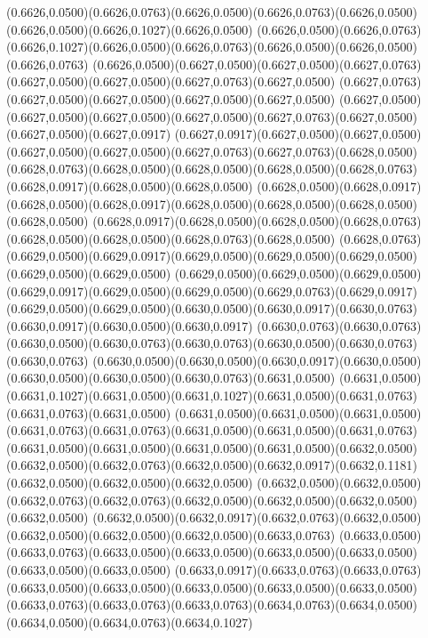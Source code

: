 (0.6626,0.0500)(0.6626,0.0763)(0.6626,0.0500)(0.6626,0.0763)(0.6626,0.0500)(0.6626,0.0500)(0.6626,0.1027)(0.6626,0.0500)
(0.6626,0.0500)(0.6626,0.0763)(0.6626,0.1027)(0.6626,0.0500)(0.6626,0.0763)(0.6626,0.0500)(0.6626,0.0500)(0.6626,0.0763)
(0.6626,0.0500)(0.6627,0.0500)(0.6627,0.0500)(0.6627,0.0763)(0.6627,0.0500)(0.6627,0.0500)(0.6627,0.0763)(0.6627,0.0500)
(0.6627,0.0763)(0.6627,0.0500)(0.6627,0.0500)(0.6627,0.0500)(0.6627,0.0500)
\PST@Solid(0.6627,0.0500)(0.6627,0.0500)(0.6627,0.0500)(0.6627,0.0500)(0.6627,0.0763)(0.6627,0.0500)(0.6627,0.0500)(0.6627,0.0917)
(0.6627,0.0917)(0.6627,0.0500)(0.6627,0.0500)(0.6627,0.0500)(0.6627,0.0500)(0.6627,0.0763)(0.6627,0.0763)(0.6628,0.0500)
(0.6628,0.0763)(0.6628,0.0500)(0.6628,0.0500)(0.6628,0.0500)(0.6628,0.0763)(0.6628,0.0917)(0.6628,0.0500)(0.6628,0.0500)
(0.6628,0.0500)(0.6628,0.0917)(0.6628,0.0500)(0.6628,0.0917)(0.6628,0.0500)(0.6628,0.0500)(0.6628,0.0500)(0.6628,0.0500)
(0.6628,0.0917)(0.6628,0.0500)(0.6628,0.0500)(0.6628,0.0763)(0.6628,0.0500)(0.6628,0.0500)(0.6628,0.0763)(0.6628,0.0500)
(0.6628,0.0763)(0.6629,0.0500)(0.6629,0.0917)(0.6629,0.0500)(0.6629,0.0500)(0.6629,0.0500)(0.6629,0.0500)(0.6629,0.0500)
(0.6629,0.0500)(0.6629,0.0500)(0.6629,0.0500)(0.6629,0.0917)(0.6629,0.0500)(0.6629,0.0500)(0.6629,0.0763)(0.6629,0.0917)
(0.6629,0.0500)(0.6629,0.0500)(0.6630,0.0500)(0.6630,0.0917)(0.6630,0.0763)(0.6630,0.0917)(0.6630,0.0500)(0.6630,0.0917)
(0.6630,0.0763)(0.6630,0.0763)(0.6630,0.0500)(0.6630,0.0763)(0.6630,0.0763)(0.6630,0.0500)(0.6630,0.0763)(0.6630,0.0763)
(0.6630,0.0500)(0.6630,0.0500)(0.6630,0.0917)(0.6630,0.0500)(0.6630,0.0500)(0.6630,0.0500)(0.6630,0.0763)(0.6631,0.0500)
(0.6631,0.0500)(0.6631,0.1027)(0.6631,0.0500)(0.6631,0.1027)(0.6631,0.0500)(0.6631,0.0763)(0.6631,0.0763)(0.6631,0.0500)
(0.6631,0.0500)(0.6631,0.0500)(0.6631,0.0500)(0.6631,0.0763)(0.6631,0.0763)(0.6631,0.0500)(0.6631,0.0500)(0.6631,0.0763)
(0.6631,0.0500)(0.6631,0.0500)(0.6631,0.0500)(0.6631,0.0500)(0.6632,0.0500)
\PST@Solid(0.6632,0.0500)(0.6632,0.0763)(0.6632,0.0500)(0.6632,0.0917)(0.6632,0.1181)(0.6632,0.0500)(0.6632,0.0500)(0.6632,0.0500)
(0.6632,0.0500)(0.6632,0.0500)(0.6632,0.0763)(0.6632,0.0763)(0.6632,0.0500)(0.6632,0.0500)(0.6632,0.0500)(0.6632,0.0500)
(0.6632,0.0500)(0.6632,0.0917)(0.6632,0.0763)(0.6632,0.0500)(0.6632,0.0500)(0.6632,0.0500)(0.6632,0.0500)(0.6633,0.0763)
(0.6633,0.0500)(0.6633,0.0763)(0.6633,0.0500)(0.6633,0.0500)(0.6633,0.0500)(0.6633,0.0500)(0.6633,0.0500)(0.6633,0.0500)
(0.6633,0.0917)(0.6633,0.0763)(0.6633,0.0763)(0.6633,0.0500)(0.6633,0.0500)(0.6633,0.0500)(0.6633,0.0500)(0.6633,0.0500)
(0.6633,0.0763)(0.6633,0.0763)(0.6633,0.0763)(0.6634,0.0763)(0.6634,0.0500)(0.6634,0.0500)(0.6634,0.0763)(0.6634,0.1027)
